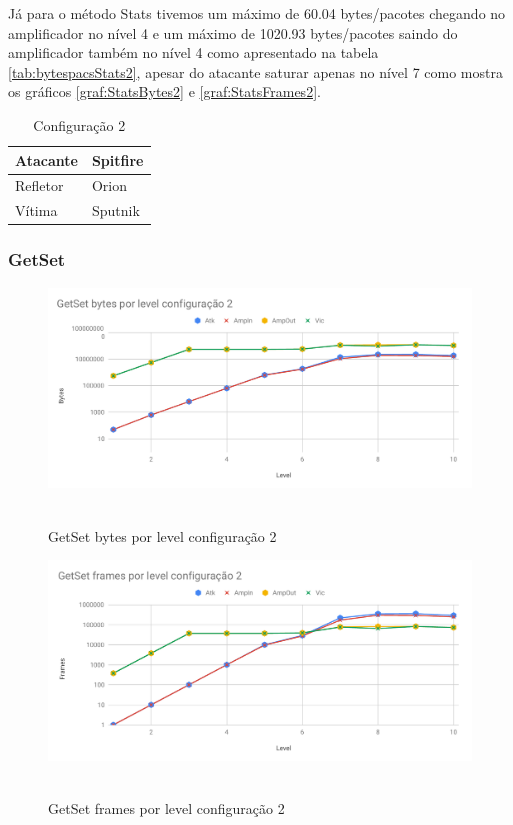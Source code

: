Já para o método Stats tivemos um máximo de 60.04 bytes/pacotes chegando no amplificador no nível 4 e um máximo de 1020.93 bytes/pacotes saindo do amplificador também no nível 4 como apresentado na tabela \ref{tab:bytespacsStats2}, apesar do atacante saturar apenas no nível 7 como mostra os gráficos \ref{graf:StatsBytes2} e \ref{graf:StatsFrames2}.

\begin{table}[H]
\centering
\caption{Configuração 2}
\begin{tabular}{|l|l|}
\hline
Atacante     & Spitfire  \\ \hline
Refletor     & Orion     \\ \hline
Vítima       & Sputnik   \\ \hline
\end{tabular}
\end{table}

\subsubsection{GetSet}

\begin{figure}[H]
     \centering
     \label{graf:GetSetBytes2}
     \includegraphics[scale=0.6]{img/capturas/GetSetBLC2.pdf}\
     \caption{GetSet bytes por level configuração 2}
\end{figure}

\begin{figure}[H]
     \centering
     \label{graf:GetSetFrames2}
     \includegraphics[scale=0.6]{img/capturas/GetSetFLC2.pdf}\
     \caption{GetSet frames por level configuração 2}
\end{figure}


